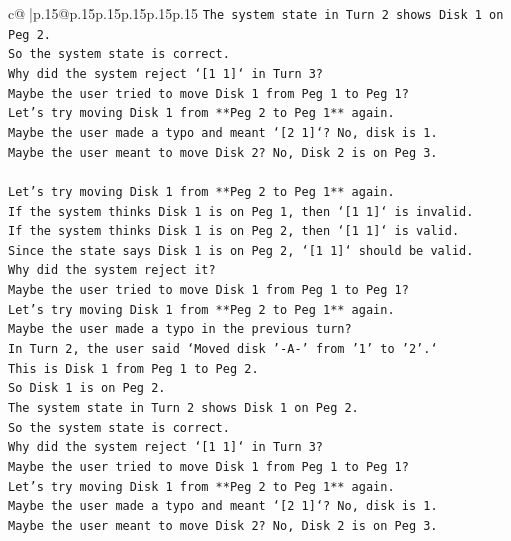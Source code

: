 \documentclass{article}
\begin{document}
{\begin{supertabular}{c@{$\;$}|p{.15\linewidth}@{}p{.15\linewidth}p{.15\linewidth}p{.15\linewidth}p{.15\linewidth}p{.15\linewidth}}
{{{\texttt{The system state in Turn 2 shows Disk 1 on Peg 2.} \\
\texttt{So the system state is correct.} \\
\texttt{Why did the system reject `{[}1 1{]}` in Turn 3?} \\
\texttt{Maybe the user tried to move Disk 1 from Peg 1 to Peg 1?} \\
\texttt{Let's try moving Disk 1 from **Peg 2 to Peg 1** again.} \\
\texttt{Maybe the user made a typo and meant `{[}2 1{]}`? No, disk is 1.} \\
\texttt{Maybe the user meant to move Disk 2? No, Disk 2 is on Peg 3.} \\
\\ 
\texttt{Let's try moving Disk 1 from **Peg 2 to Peg 1** again.} \\
\texttt{If the system thinks Disk 1 is on Peg 1, then `{[}1 1{]}` is invalid.} \\
\texttt{If the system thinks Disk 1 is on Peg 2, then `{[}1 1{]}` is valid.} \\
\texttt{Since the state says Disk 1 is on Peg 2, `{[}1 1{]}` should be valid.} \\
\texttt{Why did the system reject it?} \\
\texttt{Maybe the user tried to move Disk 1 from Peg 1 to Peg 1?} \\
\texttt{Let's try moving Disk 1 from **Peg 2 to Peg 1** again.} \\
\texttt{Maybe the user made a typo in the previous turn?} \\
\texttt{In Turn 2, the user said `Moved disk '{-}A{-}' from '1' to '2'.`} \\
\texttt{This is Disk 1 from Peg 1 to Peg 2.} \\
\texttt{So Disk 1 is on Peg 2.} \\
\texttt{The system state in Turn 2 shows Disk 1 on Peg 2.} \\
\texttt{So the system state is correct.} \\
\texttt{Why did the system reject `{[}1 1{]}` in Turn 3?} \\
\texttt{Maybe the user tried to move Disk 1 from Peg 1 to Peg 1?} \\
\texttt{Let's try moving Disk 1 from **Peg 2 to Peg 1** again.} \\
\texttt{Maybe the user made a typo and meant `{[}2 1{]}`? No, disk is 1.} \\
\texttt{Maybe the user meant to move Disk 2? No, Disk 2 is on Peg 3.} \\
}}}
\end{supertabular}}
\end{document}
